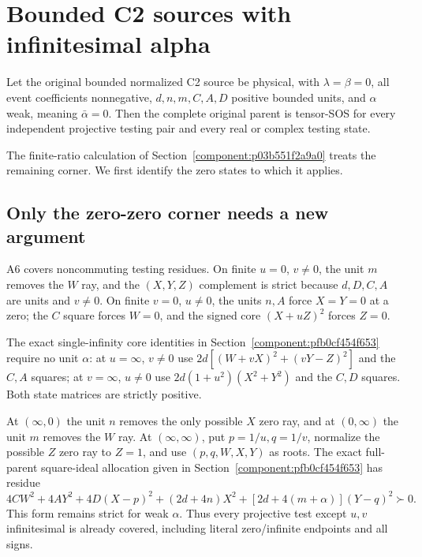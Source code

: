 \section{\texorpdfstring{Bounded C2 sources with infinitesimal alpha}{Bounded C2 sources with infinitesimal alpha}}
\label{component:pf31e38136e03}



\begin{theorem}
Let the original bounded normalized C2 source be physical, with
$\lambda=\beta=0$, all event coefficients nonnegative,
$d,n,m,C,A,D$ positive bounded units, and $\alpha$ weak, meaning
$\bar\alpha=0$. Then the complete original parent is tensor-SOS
for every independent projective testing pair and every real or
complex testing state.
\end{theorem}

The finite-ratio calculation of
Section~\ref{component:p03b551f2a9a0} treats the remaining corner.
We first identify the zero states to which it applies.

\subsection*{Only the zero-zero corner needs a new argument}

A6 covers noncommuting testing residues. On finite $u=0$, $v\ne0$,
the unit $m$ removes the $W$ ray, and the $(X,Y,Z)$ complement is
strict because $d,D,C,A$ are units and $v\ne0$. On finite $v=0$,
$u\ne0$, the units $n,A$ force $X=Y=0$ at a zero; the $C$ square
forces $W=0$, and the signed core $(X+uZ)^2$ forces $Z=0$.

The exact single-infinity core identities in
Section~\ref{component:pfb0cf454f653} require no unit $\alpha$: at
$u=\infty$, $v\ne0$ use
$2d[(W+vX)^2+(vY-Z)^2]$ and the $C,A$ squares; at $v=\infty$,
$u\ne0$ use $2d(1+u^2)(X^2+Y^2)$ and the $C,D$ squares.
Both state matrices are strictly positive.

At $(\infty,0)$ the unit $n$ removes the only possible $X$ zero
ray, and at $(0,\infty)$ the unit $m$ removes the $W$ ray.
At $(\infty,\infty)$, put $p=1/u,q=1/v$, normalize the possible
$Z$ zero ray to $Z=1$, and use $(p,q,W,X,Y)$ as roots. The exact
full-parent square-ideal allocation given in
Section~\ref{component:pfb0cf454f653} has residue
\[
 4CW^2+4AY^2+4D(X-p)^2+(2d+4n)X^2
                         +[2d+4(m+\alpha)](Y-q)^2\succ0.
\]
This form remains strict for weak $\alpha$. Thus every projective
test except $u,v$ infinitesimal is already covered, including literal
zero/infinite endpoints and all signs.

